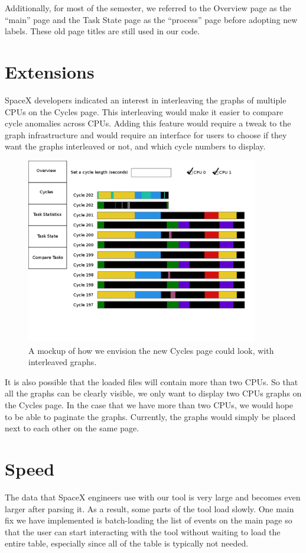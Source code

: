\documentclass{hmcclinic}
\begin{document}
  Additionally, for most of the semester, we referred to the Overview page as
  the ``main'' page and the Task State page as the ``process'' page before
  adopting new labels. These old page titles are still used in our code.

\section{Extensions}
  SpaceX developers indicated an interest in interleaving the graphs of multiple
  CPUs on the Cycles page.  This interleaving would make it easier to compare
  cycle anomalies across CPUs. Adding this feature would require a tweak to the
  graph infrastructure and would require an interface for users to choose if they
  want the graphs interleaved or not, and which cycle numbers to display.

  \begin{figure}[H]
\begin{center}
\includegraphics[width=4in]{futureCycles.png}
\caption{A mockup of how we envision the new Cycles page could look, with
interleaved graphs.}
\end{center}
\end{figure}

It is also possible that the loaded files will contain more than two CPUs.
So that all the graphs can be clearly visible, we only want to display two CPUs graphs
on the Cycles page. In the case that we have more than two CPUs, 
we would hope to be able to paginate the graphs. Currently, the graphs
would simply be placed next to each other on the same page.

\section{Speed} %
The data that SpaceX engineers use with our tool is very large and becomes even
larger after parsing it. As a result, some parts of the tool load slowly. One main fix we have
implemented is batch-loading the list of events on the main page so that the
user can start interacting with the tool without waiting to load the entire
table, especially since all of the table is typically not needed.
\end{document}
